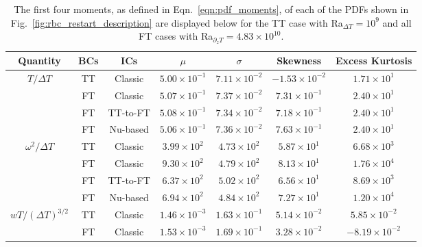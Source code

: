 \documentclass[aps, pre, onecolumn, nofootinbib, notitlepage, groupedaddress, amsfonts, amssymb, amsmath, longbibliography, superscriptaddress]{revtex4-1}
\begin{document}
\begin{table}[t!]
\vspace{-0.5cm}
\caption{ 
	The first four moments, as defined in Eqn.~\ref{eqn:pdf_moments}, of each of the PDFs shown in Fig.~\ref{fig:rbc_restart_description} are displayed below for the TT case with Ra$_{\Delta T} = 10^9$ and all FT cases with Ra$_{\partial_z T} = 4.83\times 10^{10}$.
}
\vspace{-0.25cm}
\setlength{\tabcolsep}{12pt}
\label{table:pdf_values}
\begin{center}
\begin{tabular}{c c c c c c c}
\hline																	
Quantity 				&	BCs	& ICs	    &	$\mu$					&	$\sigma$				&	Skewness	&	Excess Kurtosis \\
\hline
$T/\Delta T$			&	TT	& Classic	&	$5.00 \times 10^{-1}$	&	$7.11 \times 10^{-2}$	&	$-1.53 \times 10^{-2}$	&	$1.71 \times 10^{1}$ \\
						&	FT	& Classic	&	$5.07 \times 10^{-1}$	&	$7.37 \times 10^{-2}$	&	$7.31 \times 10^{-1}$	&	$2.40 \times 10^{1}$ \\
						&	FT	& TT-to-FT	&	$5.08 \times 10^{-1}$	&	$7.34 \times 10^{-2}$	&	$7.18 \times 10^{-1}$	&	$2.40 \times 10^{1}$ \\
						&	FT	& Nu-based	&	$5.06 \times 10^{-1}$	&	$7.36 \times 10^{-2}$	&	$7.63 \times 10^{-1}$	&	$2.40 \times 10^{1}$ \\
\hline                                                                                                                      
$\omega^2/\Delta T$		&	TT	& Classic	&	$3.99 \times 10^{2}$	&	$4.73 \times 10^{2}$	&	$5.87 \times 10^{1}$	&	$6.68 \times 10^{3}$ \\
						&	FT	& Classic	&	$9.30 \times 10^{2}$	&	$4.79 \times 10^{2}$	&	$8.13 \times 10^{1}$	&	$1.76 \times 10^{4}$ \\
						&	FT	& TT-to-FT	&	$6.37 \times 10^{2}$	&	$5.02 \times 10^{2}$	&	$6.56 \times 10^{1}$	&	$8.69 \times 10^{3}$ \\
						&	FT	& Nu-based	&	$6.94 \times 10^{2}$	&	$4.84 \times 10^{2}$	&	$7.27 \times 10^{1}$	&	$1.20 \times 10^{4}$ \\
\hline                                                                                                                      
$wT/(\Delta T)^{3/2}$	&	TT	& Classic	&	$1.46 \times 10^{-3}$	&	$1.63 \times 10^{-1}$	&	$5.14 \times 10^{-2}$	&	$5.85  \times 10^{-2}$ \\
						&	FT	& Classic	&	$1.53 \times 10^{-3}$	&	$1.69 \times 10^{-1}$	&	$3.28 \times 10^{-2}$	&	$-8.19 \times 10^{-2}$ \\

\end{tabular}
\end{center}
\end{table}
\end{document}
